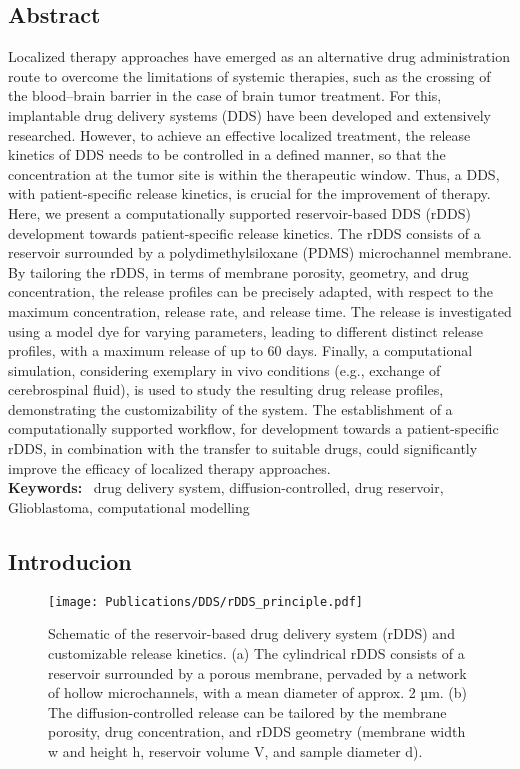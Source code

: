 \newpage


\subsection*{Abstract}
Localized therapy approaches have emerged as an alternative drug administration route to overcome the limitations of systemic therapies, such as the crossing of the blood–brain barrier in the case of brain tumor treatment. For this, implantable drug delivery systems (DDS) have been developed and extensively researched. However, to achieve an effective localized treatment, the release kinetics of DDS needs to be controlled in a defined manner, so that the concentration at the tumor site is within the therapeutic window. Thus, a DDS, with patient-specific release kinetics, is crucial for the improvement of therapy. Here, we present a computationally supported reservoir-based DDS (rDDS) development towards patient-specific release kinetics. The rDDS consists of a reservoir surrounded by a polydimethylsiloxane (PDMS) microchannel membrane. By tailoring the rDDS, in terms of membrane porosity, geometry, and drug concentration, the release profiles can be precisely adapted, with respect to the maximum concentration, release rate, and release time. The release is investigated using a model dye for varying parameters, leading to different distinct release profiles, with a maximum release of up to 60 days. Finally, a computational simulation, considering exemplary in vivo conditions (e.g., exchange of cerebrospinal fluid), is used to study the resulting drug release profiles, demonstrating the customizability of the system. The establishment of a computationally supported workflow, for development towards a patient-specific rDDS, in combination with the transfer to suitable drugs, could significantly improve the efficacy of localized therapy approaches. \\

\textbf{Keywords: }~drug delivery system, diffusion-controlled, drug reservoir, Glioblastoma, computational modelling

\subsection{Introducion}
\begin{figure}[h!]
  \centering
  \texttt{[image: Publications/DDS/rDDS\_principle.pdf]}
  \caption{Schematic of the reservoir-based drug delivery system (rDDS) and customizable release kinetics. (a) The cylindrical rDDS consists of a reservoir surrounded by a porous membrane, pervaded by a network of hollow microchannels, with a mean diameter of approx. 2 µm. (b) The diffusion-controlled release can be tailored by the membrane porosity, drug concentration, and rDDS geometry (membrane width w and height h, reservoir volume V, and sample diameter d).}
  \label{fig:rDDS_principle}
\end{figure}

